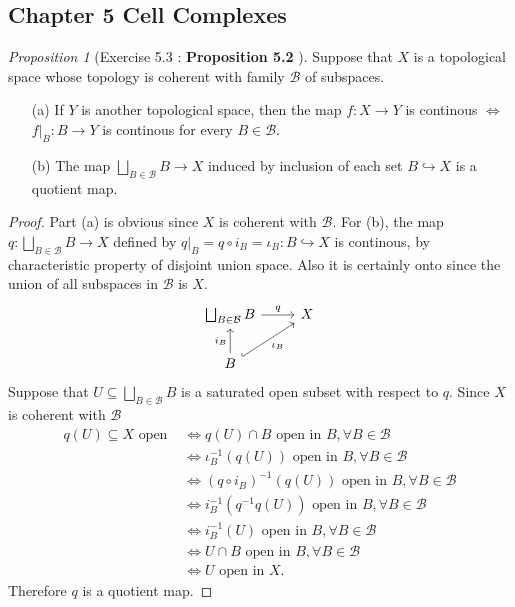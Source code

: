 \documentclass[a4paper]{article}
\theoremstyle{remark}
\newtheorem{prop}{Proposition}
\newcommand{\subhim}{\subseteq} %
\begin{document}
\subsection*{Chapter 5 Cell Complexes}
\begin{prop}[Exercise 5.3 : \textbf{Proposition 5.2} \cite{LeeTM}]
	Suppose that $X$ is a topological space whose topology is coherent with family $\mathcal{B}$ of subspaces.
	\begin{enumerate}[nolistsep]
		\item [(a)] If $Y$ is another topological space, then the map $f : X \to Y$ is continous $\Leftrightarrow$ $f|_B : B \to Y$ is continous for every $B \in \mathcal{B}$.
		\item [(b)] The map $\bigsqcup_{B \in \mathcal{B}} B \to X$ induced by inclusion of each set $B \hookrightarrow X$ is a quotient map.
	\end{enumerate} 
\end{prop}
\begin{proof}
	Part (a) is obvious since $X$ is coherent with $\mathcal{B}$. For (b), the map $q: \bigsqcup_{B \in \mathcal{B}} B \to X$ defined by $q|_B  = q \circ i_B = \iota_B : B \hookrightarrow X$ is continous, by characteristic property of disjoint union space. Also it is certainly onto since the union of all subspaces in $\mathcal{B}$ is $X$.  
	\[
	\begin{tikzcd}
	\bigsqcup_{B \in \mathcal{B}} B \arrow[r,"q"] & X \\
	B \arrow[u,"i_B"] \arrow[ur,"\iota_B",hookrightarrow,swap]
	\end{tikzcd}
	\]
	Suppose that $U \subhim \bigsqcup_{B \in \mathcal{B}} B$ is a saturated open subset with respect to $q$. Since $X$ is coherent with $\mathcal{B}$
	\begin{align*}
	q(U) \subhim X \text{ open }&\Leftrightarrow q(U)\cap B \text{ open in }B, \forall B \in \mathcal{B} \\
	&\Leftrightarrow \iota_{B}^{-1}(q(U)) \text{ open in }B, \forall B \in \mathcal{B} \\
	&\Leftrightarrow (q \circ i_{B})^{-1}(q(U)) \text{ open in }B, \forall B \in \mathcal{B}\\
	&\Leftrightarrow i_B^{-1} (q^{-1}q(U))  \text{ open in }B, \forall B \in \mathcal{B}\\
	&\Leftrightarrow i_B^{-1} (U)  \text{ open in }B, \forall B \in \mathcal{B} \\
	&\Leftrightarrow U \cap B \text{ open in }B, \forall B \in \mathcal{B}\\
	&\Leftrightarrow U \text{ open in }X.
	\end{align*}
	Therefore $q$ is a quotient map.
\end{proof}
\end{document}
